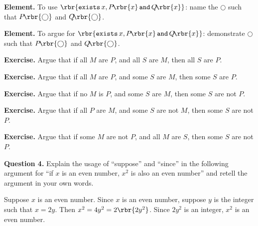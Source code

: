 \documentclass[oneside,12pt]{article}
\def\opand{\mathop{\mathtt{and}}}
\def\opexists{\mathop{\mathtt{exists}}}
\begin{document}
\hspace{-0.75in}\llap{$\Box$ } \textbf{Element.} To use $ \rbr{ \opexists x, P\!\rbr{x} \opand Q\!\rbr{x} } $: name the $\bigcirc$ such that $ P\!\rbr{\bigcirc} $ and $ Q\!\rbr{\bigcirc} $.

\hspace{-0.75in}\llap{$\Box$ } \textbf{Element.} To argue for $ \rbr{ \opexists x, P\!\rbr{x} \opand Q\!\rbr{x} } $: demonstrate $\bigcirc$ such that $ P\!\rbr{\bigcirc} $ and $ Q\!\rbr{\bigcirc} $.

\leavevmode

\hspace{-0.75in}\llap{> } \textbf{Exercise.} Argue that if all $M$ are $P$, and all $S$ are $M$, then all $S$ are $P$.

\hspace{-0.75in}\llap{> } \textbf{Exercise.} Argue that if all $M$ are $P$, and some $S$ are $M$, then some $S$ are $P$.

\hspace{-0.75in}\llap{> } \textbf{Exercise.} Argue that if no $M$ is $P$, and some $S$ are $M$, then some $S$ are not $P$.

\hspace{-0.75in}\llap{> } \textbf{Exercise.} Argue that if all $P$ are $M$, and some $S$ are not $M$, then some $S$ are not $P$.

\hspace{-0.75in}\llap{> } \textbf{Exercise.} Argue that if some $M$ are not $P$, and all $M$ are $S$, then some $S$ are not $P$.

\leavevmode

\hspace{-0.75in} \textbf{Question 4.} Explain the usage of ``suppose'' and ``since'' in the following argument for ``if $x$ is an even number, $x^2$ is also an even number'' and retell the argument in your own words.
\begin{mdframed}
Suppose $x$ is an even number. Since $x$ is an even number, suppose $y$ is the integer such that $ x = 2 y $. Then $ x^2 = 4 y^2 = 2 \rbr{ 2 y^2 } $. Since $ 2 y^2 $ is an integer, $x^2$ is an even number.
\end{mdframed}

\leavevmode
\end{document}
